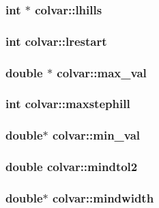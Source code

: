 \subsubsection{\setlength{\rightskip}{0pt plus 5cm}int $\ast$ {\bf colvar::lhills}}\label{structcolvar_f455df54cb802e47f9006e1d22491979}


\subsubsection{\setlength{\rightskip}{0pt plus 5cm}int {\bf colvar::lrestart}}\label{structcolvar_b4c63fa7c02f0e8a70b75fabb4227f60}


\subsubsection{\setlength{\rightskip}{0pt plus 5cm}double $\ast$ {\bf colvar::max\_\-val}}\label{structcolvar_494be1a1e6d987ca8eb66bce2d224cc9}


\subsubsection{\setlength{\rightskip}{0pt plus 5cm}int {\bf colvar::maxstephill}}\label{structcolvar_61a8d5f7a3c11cf471f44e1bd380a45e}


\subsubsection{\setlength{\rightskip}{0pt plus 5cm}double$\ast$ {\bf colvar::min\_\-val}}\label{structcolvar_0a768a5a18c76af4c98bfb1821df97e0}


\subsubsection{\setlength{\rightskip}{0pt plus 5cm}double {\bf colvar::mindtol2}}\label{structcolvar_3a1227aba11263c694e14a3c59cb9695}


\subsubsection{\setlength{\rightskip}{0pt plus 5cm}double$\ast$ {\bf colvar::mindwidth}}\label{structcolvar_6cf4f9af662384975bf7138b09332524}


